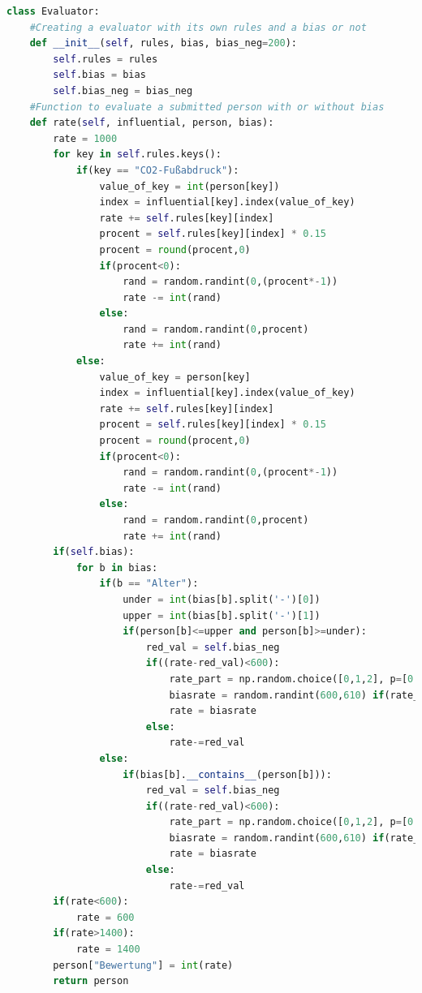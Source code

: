 \documentclass[a4paper,12pt]{report}
\begin{document}
\begin{lstlisting}[language=Python,label={lst:Sz2Z6},caption=Sechste Zelle Klasse für das erstellen eines Bewerter Objektes]
class Evaluator:
    #Creating a evaluator with its own rules and a bias or not
    def __init__(self, rules, bias, bias_neg=200):
        self.rules = rules
        self.bias = bias
        self.bias_neg = bias_neg
    #Function to evaluate a submitted person with or without bias
    def rate(self, influential, person, bias):
        rate = 1000
        for key in self.rules.keys():
            if(key == "CO2-Fußabdruck"):
                value_of_key = int(person[key])
                index = influential[key].index(value_of_key)
                rate += self.rules[key][index]
                procent = self.rules[key][index] * 0.15
                procent = round(procent,0)
                if(procent<0):
                    rand = random.randint(0,(procent*-1))
                    rate -= int(rand)
                else:
                    rand = random.randint(0,procent)
                    rate += int(rand)
            else:
                value_of_key = person[key]
                index = influential[key].index(value_of_key)
                rate += self.rules[key][index]
                procent = self.rules[key][index] * 0.15
                procent = round(procent,0)
                if(procent<0):
                    rand = random.randint(0,(procent*-1))
                    rate -= int(rand)
                else:
                    rand = random.randint(0,procent)
                    rate += int(rand)
        if(self.bias):
            for b in bias:
                if(b == "Alter"):
                    under = int(bias[b].split('-')[0])
                    upper = int(bias[b].split('-')[1])
                    if(person[b]<=upper and person[b]>=under):                       
                        red_val = self.bias_neg
                        if((rate-red_val)<600):
                            rate_part = np.random.choice([0,1,2], p=[0.4,0.35,0.25])
                            biasrate = random.randint(600,610) if(rate_part == 0) else random.randint(611,620) if(rate_part == 1) else random.randint(621,630)
                            rate = biasrate
                        else:
                            rate-=red_val
                else:
                    if(bias[b].__contains__(person[b])):
                        red_val = self.bias_neg
                        if((rate-red_val)<600):
                            rate_part = np.random.choice([0,1,2], p=[0.4,0.35,0.25])
                            biasrate = random.randint(600,610) if(rate_part == 0) else random.randint(611,620) if(rate_part == 1) else random.randint(621,630)
                            rate = biasrate
                        else:
                            rate-=red_val
        if(rate<600):
            rate = 600
        if(rate>1400):
            rate = 1400
        person["Bewertung"] = int(rate)
        return person
\end{lstlisting}
\end{document}
